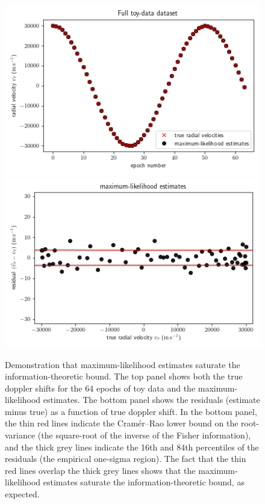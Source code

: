 \documentclass[modern]{aastex631}
\begin{document}
\begin{figure}[tp]
  \begin{mdframed}
    \begin{center}
    \includegraphics[width=\textwidth]{../notebook/full.png}
    \includegraphics[width=\textwidth]{../notebook/mlrvs.png}
    \end{center}
    \caption{Demonstration that maximum-likelihood estimates saturate the information-theoretic bound.
    The top panel shows both the true doppler shifts for the 64 epochs of toy data and the maximum-likelihood estimates.
    The bottom panel shows the residuals (estimate minus true) as a function of true doppler shift.
    In the bottom panel, the thin red lines indicate the Cram\'er--Rao lower bound on the root-variance (the square-root of the inverse of the Fisher information), and the thick grey lines indicate the 16th and 84th percentiles of the residuals (the empirical one-sigma region).
    The fact that the thin red lines overlap the thick grey lines shows that the maximum-likelihood estimates saturate the information-theoretic bound, as expected.\label{fig:mlrvs}}
  \end{mdframed}
\end{figure}
\end{document}
